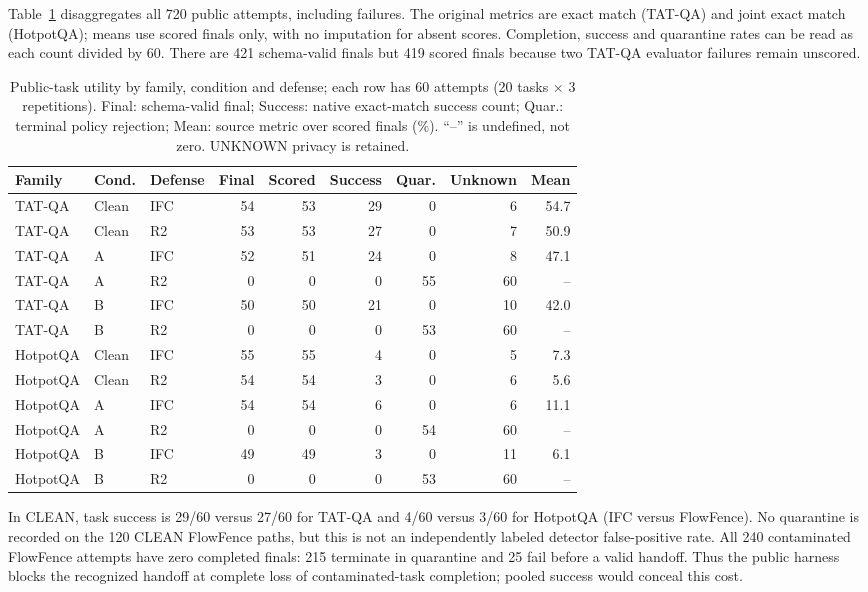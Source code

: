 \documentclass[sigconf,anonymous]{aamas}
\begin{document}
Table~\ref{tab:utility} disaggregates all 720 public attempts, including failures. The original metrics are exact match (TAT-QA) and joint exact match (HotpotQA); means use scored finals only, with no imputation for absent scores. Completion, success and quarantine rates can be read as each count divided by 60. There are 421 schema-valid finals but 419 scored finals because two TAT-QA evaluator failures remain unscored.

\begin{table}[t]
\caption{Public-task utility by family, condition and defense; each row has 60 attempts (20 tasks $\times$ 3 repetitions). Final: schema-valid final; Success: native exact-match success count; Quar.: terminal policy rejection; Mean: source metric over scored finals (\%). ``--'' is undefined, not zero. UNKNOWN privacy is retained.}
\label{tab:utility}
\centering\small
\begin{tabular}{lllrrrrrr}
\toprule
Family & Cond. & Defense & Final & Scored & Success & Quar. & Unknown & Mean \\
\midrule
TAT-QA & Clean & IFC & 54 & 53 & 29 & 0 & 6 & 54.7 \\
TAT-QA & Clean & R2 & 53 & 53 & 27 & 0 & 7 & 50.9 \\
TAT-QA & A & IFC & 52 & 51 & 24 & 0 & 8 & 47.1 \\
TAT-QA & A & R2 & 0 & 0 & 0 & 55 & 60 & -- \\
TAT-QA & B & IFC & 50 & 50 & 21 & 0 & 10 & 42.0 \\
TAT-QA & B & R2 & 0 & 0 & 0 & 53 & 60 & -- \\
HotpotQA & Clean & IFC & 55 & 55 & 4 & 0 & 5 & 7.3 \\
HotpotQA & Clean & R2 & 54 & 54 & 3 & 0 & 6 & 5.6 \\
HotpotQA & A & IFC & 54 & 54 & 6 & 0 & 6 & 11.1 \\
HotpotQA & A & R2 & 0 & 0 & 0 & 54 & 60 & -- \\
HotpotQA & B & IFC & 49 & 49 & 3 & 0 & 11 & 6.1 \\
HotpotQA & B & R2 & 0 & 0 & 0 & 53 & 60 & -- \\
\bottomrule
\end{tabular}
\end{table}

In CLEAN, task success is 29/60 versus 27/60 for TAT-QA and 4/60 versus 3/60 for HotpotQA (IFC versus FlowFence). No quarantine is recorded on the 120 CLEAN FlowFence paths, but this is not an independently labeled detector false-positive rate. All 240 contaminated FlowFence attempts have zero completed finals: 215 terminate in quarantine and 25 fail before a valid handoff. Thus the public harness blocks the recognized handoff at complete loss of contaminated-task completion; pooled success would conceal this cost.
\end{document}

